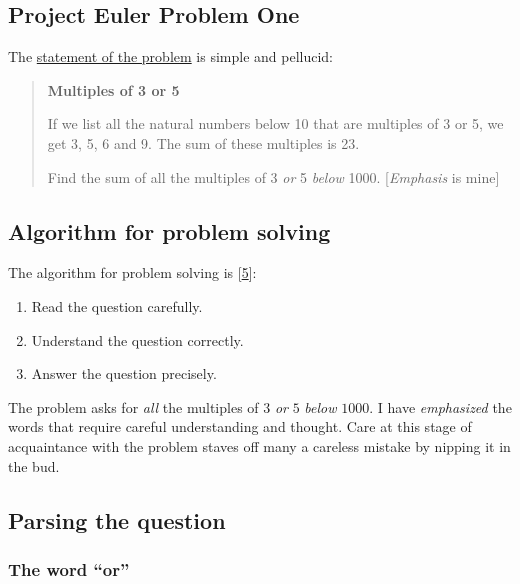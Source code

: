 \documentclass[
  a4paper,
]{article}
\providecommand{\tightlist}{%
  \setlength{\itemsep}{0pt}\setlength{\parskip}{0pt}}
\begin{document}
\hypertarget{project-euler-problem-one}{%
\subsection{Project Euler Problem One}\label{project-euler-problem-one}}

The \href{https://projecteuler.net/problem=1}{statement of the problem}
is simple and pellucid:

\begin{quote}
\textbf{Multiples of 3 or 5}

If we list all the natural numbers below 10 that are multiples of 3 or
5, we get 3, 5, 6 and 9. The sum of these multiples is 23.

Find the sum of all the multiples of 3 \emph{or} 5 \emph{below} 1000.
{[}\emph{Emphasis} is mine{]}
\end{quote}

\hypertarget{algorithm-for-problem-solving}{%
\subsection{Algorithm for problem
solving}\label{algorithm-for-problem-solving}}

The algorithm for problem solving is
{[}\protect\hyperlink{ref-sas}{5}{]}:

\begin{enumerate}
\tightlist
\item
  Read the question carefully.
\item
  Understand the question correctly.
\item
  Answer the question precisely.
\end{enumerate}

The problem asks for \emph{all} the multiples of \(3\) \emph{or} \(5\)
\emph{below} \(1000\). I have \emph{emphasized} the words that require
careful understanding and thought. Care at this stage of acquaintance
with the problem staves off many a careless mistake by nipping it in the
bud.

\hypertarget{parsing-the-question}{%
\subsection{Parsing the question}\label{parsing-the-question}}

\hypertarget{the-word-or}{%
\subsubsection{The word ``or''}\label{the-word-or}}
\end{document}
